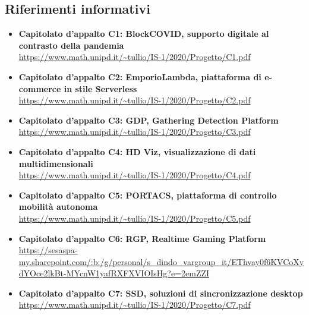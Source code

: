 \subsection{Riferimenti informativi} \label{RiferimentiInformativi}
\begin{itemize}
	\item \textbf{Capitolato d'appalto C1: BlockCOVID, supporto digitale al contrasto della pandemia} \\ 
	\url{https://www.math.unipd.it/~tullio/IS-1/2020/Progetto/C1.pdf}
	\item \textbf{Capitolato d'appalto C2: EmporioLambda, piattaforma di e-commerce in stile Serverless} \\
	\url{https://www.math.unipd.it/~tullio/IS-1/2020/Progetto/C2.pdf}
	\item \textbf{Capitolato d'appalto C3: GDP, Gathering Detection Platform}\\
	\url{https://www.math.unipd.it/~tullio/IS-1/2020/Progetto/C3.pdf}
	\item \textbf{Capitolato d'appalto C4: HD Viz, visualizzazione di dati multidimensionali}\\
	\url{https://www.math.unipd.it/~tullio/IS-1/2020/Progetto/C4.pdf}
	\item \textbf{Capitolato d'appalto C5: PORTACS, piattaforma di controllo mobilità autonoma}\\
	\url{https://www.math.unipd.it/~tullio/IS-1/2020/Progetto/C5.pdf}
	\item \textbf{Capitolato d'appalto C6: RGP, Realtime Gaming Platform}\\
	\url{https://sesaspa-my.sharepoint.com/:b:/g/personal/s\_dindo_vargroup\_it/EThvay0f6KVCoXydYOce2lkBt-MYcnW1yafRXFXVIOIsHg?e=2emZZI}
	\item \textbf{Capitolato d'appalto C7: SSD, soluzioni di sincronizzazione desktop}\\
	\url{https://www.math.unipd.it/~tullio/IS-1/2020/Progetto/C7.pdf}
\end{itemize}